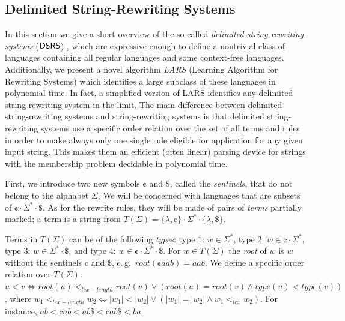 \subsection{Delimited String-Rewriting Systems}
\label{section:delimited-string-rewriting-systems}

In this section we give a short overview of the so-called \emph{delimited string-rewriting systems} (\index{$\DSRS$}$\DSRS$) \citep{Eyraud2007}, which are expressive enough to define a nontrivial class of languages containing all regular languages and some context-free languages. Additionally, we present a novel algorithm \emph{LARS} \citep{Eyraud2007} (Learning Algorithm for Rewriting Systems) which identifies a large subclass of these languages in polynomial time. In fact, a simplified version of LARS \citep{delaHiguera2010} identifies any delimited string-rewriting system in the limit. The main difference between delimited string-rewriting systems and string-rewriting systems is that delimited string-rewriting systems use a specific order relation over the set of all terms and rules in order to make always only one single rule eligible for application for any given input string. This makes them an efficient (often linear) parsing device for strings with the membership problem decidable in polynomial time.

First, we introduce two new symbols \index{$\cent$}$\cent$ and \index{$\$$}$\$$, called the \emph{sentinels}, that do not belong to the alphabet $\Sigma$. We will be concerned with languages that are subsets of $\cent \cdot \Sigma^* \cdot \$$. As for the rewrite rules, they will be made of pairs of \emph{terms} partially marked; a term is a string from $T(\Sigma) = \{\lambda, \cent\} \cdot \Sigma^* \cdot \{\lambda, \$\}$.

Terms in $T(\Sigma)$ can be of the following \emph{types}: type $1$: $w \in \Sigma^*$, type $2$: $w \in \cent \cdot \Sigma^*$, type $3$: $w \in \Sigma^* \cdot \$$, and type $4$: $w \in \cent \cdot \Sigma^* \cdot \$$. For $w \in T(\Sigma)$ the \emph{root} of $w$ is $w$ without the sentinels $\cent$ and $\$$, e.\,g.\ $root(\cent aab) = aab$. We define a specific order relation over $T(\Sigma)$: $u < v \Leftrightarrow root(u) <_{lex-length} root(v) \vee (root(u) = root(v) \wedge type(u) < type(v))$, where $w_1 <_{lex-length} w_2 \Leftrightarrow |w_1| < |w_2| \vee (|w_1| = |w_2| \wedge w_1 <_{lex} w_2)$. For instance, $ab < \cent ab < ab \$ < \cent ab \$ < ba$.

